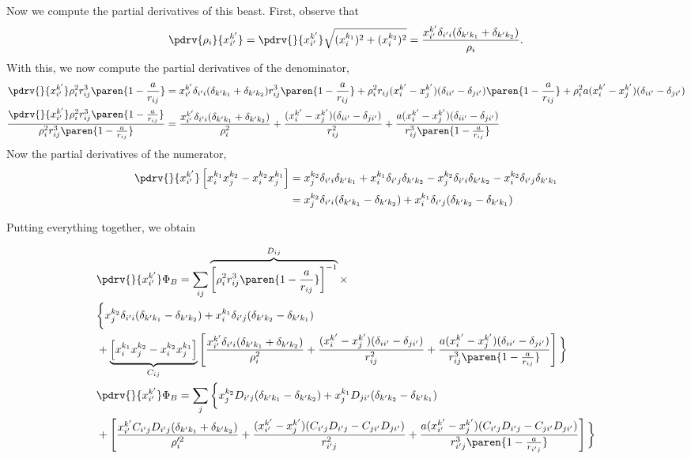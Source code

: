 \documentclass[onecolumn,amsmath,amssymb,nofootinbib,floatfix]{revtex4}
\begin{document}
Now we compute the partial derivatives of this beast.  First, observe that
$$\pdrv{\rho_i}{x_{i'}^{k'}} = \pdrv{}{x_{i'}^{k'}}\sqrt{(x_i^{k_1})^2+(x_i^{k_2})^2} = \frac{x_{i'}^{k'}\delta_{i'i}(\delta_{k'k_1} + \delta_{k'k_2})}{\rho_i}.$$
With this, we now compute the partial derivatives of the denominator,
$$
\begin{aligned}
\pdrv{}{x_{i'}^{k'}} \rho_i^2 r_{ij}^3\paren{1-\frac{a}{r_{ij}}}
&=  x_{i'}^{k'}\delta_{i'i}(\delta_{k'k_1} + \delta_{k'k_2}) r_{ij}^3\paren{1-\frac{a}{r_{ij}}}
      +\rho_i^2 r_{ij}(x_i^{k'}-x_j^{k'})(\delta_{ii'}-\delta_{ji'})\paren{1-\frac{a}{r_{ij}}}
      + \rho_i^2 a (x_i^{k'}-x_j^{k'})(\delta_{ii'}-\delta_{ji'})\\
\frac{\pdrv{}{x_{i'}^{k'}} \rho_i^2 r_{ij}^3\paren{1-\frac{a}{r_{ij}}}}{\rho_i^2 r_{ij}^3\paren{1-\frac{a}{r_{ij}}}}
&=  \frac{x_{i'}^{k'}\delta_{i'i}(\delta_{k'k_1} + \delta_{k'k_2})}{\rho_i^2}
      +\frac{(x_i^{k'}-x_j^{k'})(\delta_{ii'}-\delta_{ji'})}{r_{ij}^2}
      + \frac{a (x_i^{k'}-x_j^{k'})(\delta_{ii'}-\delta_{ji'})}{r_{ij}^3\paren{1-\frac{a}{r_{ij}}}}\\
\end{aligned}
$$
Now the partial derivatives of the numerator,
$$
\begin{aligned}
\pdrv{}{x_{i'}^{k'}}\left[x_i^{k_1}x_j^{k_2}-x_i^{k_2}x_j^{k_1}\right]
&= 
x_j^{k_2}\delta_{i'i}\delta_{k'k_1}+x_i^{k_1}\delta_{i'j}\delta_{k'k_2}
-x_j^{k_2}\delta_{i'i}\delta_{k'k_2}-x_i^{k_2}\delta_{i'j}\delta_{k'k_1}\\
&= x_j^{k_2}\delta_{i'i}(\delta_{k'k_1}-\delta_{k'k_2})+x_i^{k_1}\delta_{i'j}(\delta_{k'k_2}-\delta_{k'k_1})\\
\end{aligned}
$$

Putting everything together, we obtain

$$
\begin{aligned}
&\pdrv{}{x_{i'}^{k'}}\Phi_{B} = \sum_{ij} \overbrace{\left[\rho_i^2 r_{ij}^3\paren{1-\frac{a}{r_{ij}}}\right]^{-1}}^{D_{ij}}\times \\ &\bigg\{x_j^{k_2}\delta_{i'i}(\delta_{k'k_1}-\delta_{k'k_2})+x_i^{k_1}\delta_{i'j}(\delta_{k'k_2}-\delta_{k'k_1}) \\
&+ \underbrace{\left[x_i^{k_1}x_j^{k_2}-x_i^{k_2}x_j^{k_1}\right]}_{C_{ij}}\left[\frac{x_{i'}^{k'}\delta_{i'i}(\delta_{k'k_1} + \delta_{k'k_2})}{\rho_i^2}
      +\frac{(x_i^{k'}-x_j^{k'})(\delta_{ii'}-\delta_{ji'})}{r_{ij}^2}
      + \frac{a (x_i^{k'}-x_j^{k'})(\delta_{ii'}-\delta_{ji'})}{r_{ij}^3\paren{1-\frac{a}{r_{ij}}}}\right]\bigg\}\\
&\pdrv{}{x_{i'}^{k'}}\Phi_{B} = \sum_{j} \bigg\{x_j^{k_2}D_{i'j}(\delta_{k'k_1}-\delta_{k'k_2})+x_j^{k_1}D_{ji'}(\delta_{k'k_2}-\delta_{k'k_1}) \\
&+ \left[\frac{x_{i'}^{k'}C_{i'j}D_{i'j}(\delta_{k'k_1} + \delta_{k'k_2})}{\rho_i'^2}
      +\frac{(x_{i'}^{k'}-x_j^{k'})(C_{i'j}D_{i'j}-C_{ji'}D_{ji'})}{r_{i'j}^2}
      + \frac{a (x_{i'}^{k'}-x_j^{k'})(C_{i'j}D_{i'j}-C_{ji'}D_{ji'})}{r_{i'j}^3\paren{1-\frac{a}{r_{i'j}}}}\right]\bigg\}\\
\end{aligned}
$$
\end{document}
